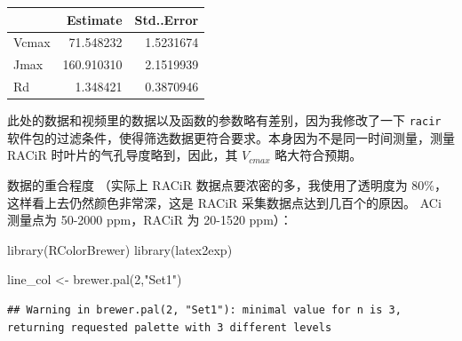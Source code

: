 \documentclass[
]{krantz}
\makeatletter
\newenvironment{Shaded}{\begin{snugshade}}{\end{snugshade}}
\newcommand{\DecValTok}[1]{\textcolor[rgb]{0.00,0.00,0.81}{#1}}
\newcommand{\FunctionTok}[1]{\textcolor[rgb]{0.00,0.00,0.00}{#1}}
\newcommand{\NormalTok}[1]{#1}
\newcommand{\OtherTok}[1]{\textcolor[rgb]{0.56,0.35,0.01}{#1}}
\newcommand{\StringTok}[1]{\textcolor[rgb]{0.31,0.60,0.02}{#1}}
\newenvironment{kframe}{%
\medskip{}
\setlength{\fboxsep}{.8em}
 \def\at@end@of@kframe{}%
 \ifinner\ifhmode%
  \def\at@end@of@kframe{\end{minipage}}%
  \begin{minipage}{\columnwidth}%
 \fi\fi%
 \def\FrameCommand##1{\hskip\@totalleftmargin \hskip-\fboxsep
 \colorbox{shadecolor}{##1}\hskip-\fboxsep
     \hskip-\linewidth \hskip-\@totalleftmargin \hskip\columnwidth}%
 \MakeFramed {\advance\hsize-\width
   \@totalleftmargin\z@ \linewidth\hsize
   \@setminipage}}%
 {\par\unskip\endMakeFramed%
 \at@end@of@kframe}
\renewenvironment{Shaded}{\begin{kframe}}{\end{kframe}}
\makeatother
\begin{document}
\begin{tabular}{l|r|r}
\hline
  & Estimate & Std..Error\\
\hline
Vcmax & 71.548232 & 1.5231674\\
\hline
Jmax & 160.910310 & 2.1519939\\
\hline
Rd & 1.348421 & 0.3870946\\
\hline
\end{tabular}

此处的数据和视频里的数据以及函数的参数略有差别，因为我修改了一下 \texttt{racir} 软件包的过滤条件，使得筛选数据更符合要求。本身因为不是同一时间测量，测量 RACiR 时叶片的气孔导度略到，因此，其 \(V_{cmax}\) 略大符合预期。

数据的重合程度 （实际上 RACiR 数据点要浓密的多，我使用了透明度为 80\%，这样看上去仍然颜色非常深，这是 RACiR 采集数据点达到几百个的原因。 ACi 测量点为 50-2000 ppm，RACiR 为 20-1520 ppm）：

\begin{Shaded}
\begin{Highlighting}[]
\FunctionTok{library}\NormalTok{(RColorBrewer)}
\FunctionTok{library}\NormalTok{(latex2exp)}

\NormalTok{line\_col }\OtherTok{\textless{}{-}} \FunctionTok{brewer.pal}\NormalTok{(}\DecValTok{2}\NormalTok{,}\StringTok{"Set1"}\NormalTok{)}
\end{Highlighting}
\end{Shaded}

\begin{verbatim}
## Warning in brewer.pal(2, "Set1"): minimal value for n is 3, returning requested palette with 3 different levels
\end{verbatim}
\end{document}

